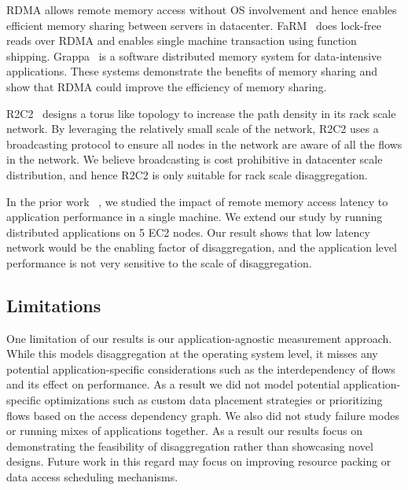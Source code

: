 RDMA allows remote memory access without OS involvement and hence enables efficient memory sharing between servers in datacenter.
FaRM~\cite{farm} does lock-free reads over RDMA and enables single machine transaction using function shipping. 
Grappa~\cite{grappa} is a software distributed memory system for data-intensive applications.
These systems demonstrate the benefits of memory sharing and show that RDMA could improve the efficiency of memory sharing.



R2C2~\cite{r2c2} designs a torus like topology to increase the path density in its rack scale network.
By leveraging the relatively small scale of the network, R2C2 uses a broadcasting protocol to ensure all nodes in the network are aware of all the flows in the network.
We believe broadcasting is cost prohibitive in datacenter scale distribution, and hence R2C2 is only suitable for rack scale disaggregation.

In the prior work ~\cite{hotnets}, we studied the impact of remote memory access latency to application performance in a single machine.
We extend our study by running distributed applications on 5 EC2 nodes.
Our result shows that low latency network would be the enabling factor of disaggregation, and the application level performance is not very sensitive to the scale of disaggregation.






\subsection{Limitations}
One limitation of our results is our application-agnostic measurement approach. While this models disaggregation at the operating system level, it misses any potential application-specific considerations such as the interdependency of flows and its effect on performance. As a result we did not model potential application-specific optimizations such as custom data placement strategies or prioritizing flows based on the access dependency graph. We also did not study failure modes or running mixes of applications together. As a result our results focus on demonstrating the feasibility of disaggregation rather than showcasing novel designs. Future work in this regard may focus on improving resource packing or data access scheduling mechanisms.







